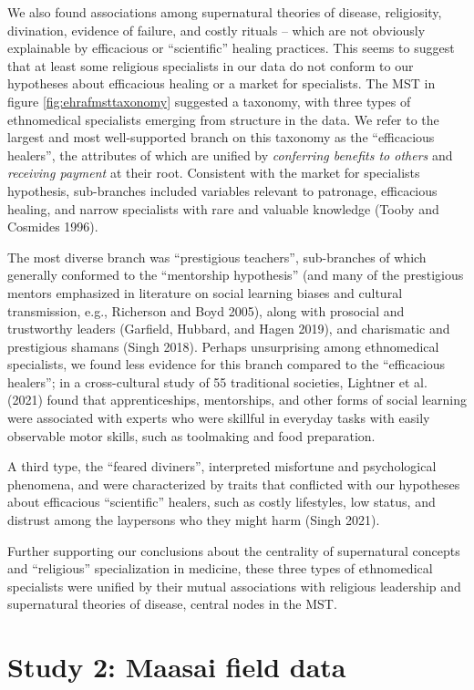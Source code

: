 \documentclass[
  11pt,
]{article}
\begin{document}
We also found associations among supernatural theories of disease, religiosity, divination, evidence of failure, and costly rituals -- which are not obviously explainable by efficacious or ``scientific'' healing practices. This seems to suggest that at least some religious specialists in our data do not conform to our hypotheses about efficacious healing or a market for specialists.
The MST in figure \ref{fig:ehrafmsttaxonomy} suggested a taxonomy, with three types of ethnomedical specialists emerging from structure in the data. We refer to the largest and most well-supported branch on this taxonomy as the ``efficacious healers'', the attributes of which are unified by \emph{conferring benefits to others} and \emph{receiving payment} at their root. Consistent with the market for specialists hypothesis, sub-branches included variables relevant to patronage, efficacious healing, and narrow specialists with rare and valuable knowledge (Tooby and Cosmides 1996).

The most diverse branch was ``prestigious teachers'', sub-branches of which generally conformed to the ``mentorship hypothesis'' (and many of the prestigious mentors emphasized in literature on social learning biases and cultural transmission, e.g., Richerson and Boyd 2005), along with prosocial and trustworthy leaders (Garfield, Hubbard, and Hagen 2019), and charismatic and prestigious shamans (Singh 2018). Perhaps unsurprising among ethnomedical specialists, we found less evidence for this branch compared to the ``efficacious healers''; in a cross-cultural study of 55 traditional societies, Lightner et al. (2021) found that apprenticeships, mentorships, and other forms of social learning were associated with experts who were skillful in everyday tasks with easily observable motor skills, such as toolmaking and food preparation.

A third type, the ``feared diviners'', interpreted misfortune and psychological phenomena, and were characterized by traits that conflicted with our hypotheses about efficacious ``scientific'' healers, such as costly lifestyles, low status, and distrust among the laypersons who they might harm (Singh 2021).

Further supporting our conclusions about the centrality of supernatural concepts and ``religious'' specialization in medicine, these three types of ethnomedical specialists were unified by their mutual associations with religious leadership and supernatural theories of disease, central nodes in the MST.

\hypertarget{study-2-maasai-field-data}{%
\section{Study 2: Maasai field data}\label{study-2-maasai-field-data}}
\end{document}
